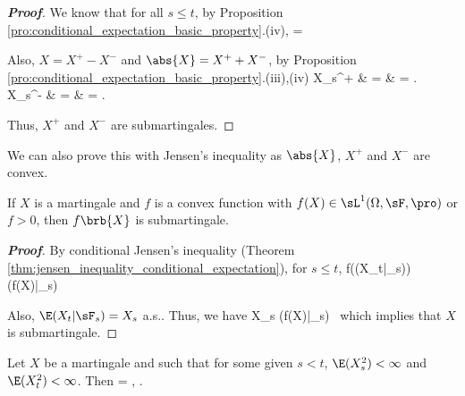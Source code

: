 \begin{proof}[\bf Proof]
We know that for all $s\leq t$, by Proposition \ref{pro:conditional_expectation_basic_property}.(iv),
\be
{} =  \leq \E{} \ \ra \  
\ee

Also, $X = X^+ - X^-$ and $\abs{X} = X^+ + X^-$, by Proposition \ref{pro:conditional_expectation_basic_property}.(iii),(iv)
\beast
X_s^+ & = &   \leq {}  = \E {} .\\
X_s^- & = &   \leq {}  = \E {} .
\eeast

Thus, $X^+$ and $X^-$ are submartingales.
\end{proof}

\begin{remark}
We can also prove this with Jensen's inequality as $\abs{X}$, $X^+$ and $X^-$ are convex.
\end{remark}

\begin{proposition}\label{pro:convex_implies_submartingale}
If $X$ is a martingale and $f$ is a convex function with $f(X) \in \sL^1(\Omega,\sF,\pro)$ or $f > 0$, then $f\brb{X}$ is submartingale.
\end{proposition}

\begin{proof}[\bf Proof]
By conditional Jensen's inequality (Theorem \ref{thm:jensen_inequality_conditional_expectation}), for $s\leq t$,
\be
f(\E(X_t|\sF_s)) \leq \E(f(X)|\sF_s)\ 
\ee

Also, $\E(X_t|\sF_s) = X_s$ a.s.. Thus, we have
\be
X_s \leq \E(f(X)|\sF_s)\ 
\ee
which implies that $X$ is submartingale.
\end{proof}


\begin{lemma}\label{lem:sl2_martingale_trick}
Let $X$ be a martingale and such that for some given $s < t$, $\E(X^2_s ) < \infty$ and $\E(X^2_t ) < \infty$. Then
\be
\E{} = \E{}, \quad{}.
\ee
\end{lemma}

